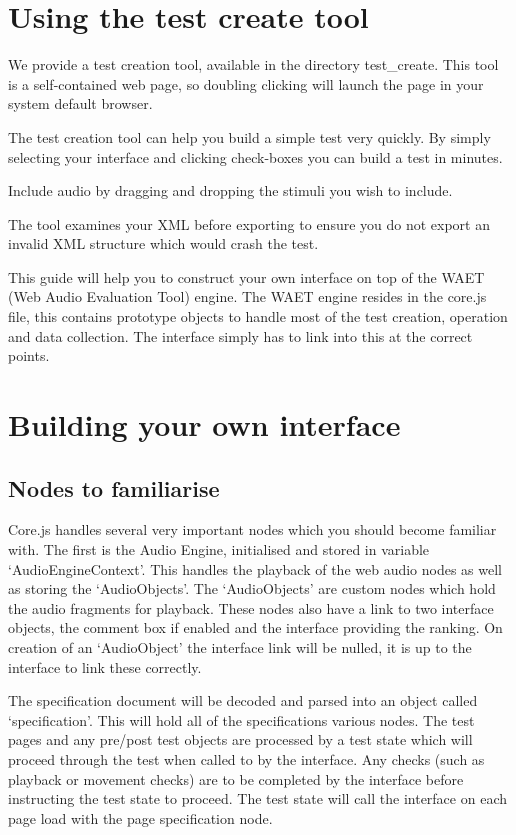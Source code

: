 \documentclass[11pt, oneside]{article}   	%
\begin{document}
\clearpage


\section{Using the test create tool}
	We provide a test creation tool, available in the directory test\_create. This tool is a self-contained web page, so doubling clicking will launch the page in your system default browser.

	The test creation tool can help you build a simple test very quickly. By simply selecting your interface and clicking check-boxes you can build a test in minutes.

	Include audio by dragging and dropping the stimuli you wish to include. 

	The tool examines your XML before exporting to ensure you do not export an invalid XML structure which would crash the test.
	
	This guide will help you to construct your own interface on top of the WAET (Web Audio Evaluation Tool) engine. The WAET engine resides in the core.js file, this contains prototype objects to handle most of the test creation, operation and data collection. The interface simply has to link into this at the correct points.
	
\section{Building your own interface}

	\subsection{Nodes to familiarise}
		Core.js handles several very important nodes which you should become familiar with. The first is the Audio Engine, initialised and stored in variable `AudioEngineContext'. This handles the playback of the web audio nodes as well as storing the `AudioObjects'. The `AudioObjects' are custom nodes which hold the audio fragments for playback. These nodes also have a link to two interface objects, the comment box if enabled and the interface providing the ranking. On creation of an `AudioObject' the interface link will be nulled, it is up to the interface to link these correctly.

		The specification document will be decoded and parsed into an object called `specification'. This will hold all of the specifications various nodes. The test pages and any pre/post test objects are processed by a test state which will proceed through the test when called to by the interface. Any checks (such as playback or movement checks) are to be completed by the interface before instructing the test state to proceed. The test state will call the interface on each page load with the page specification node.
\end{document}

